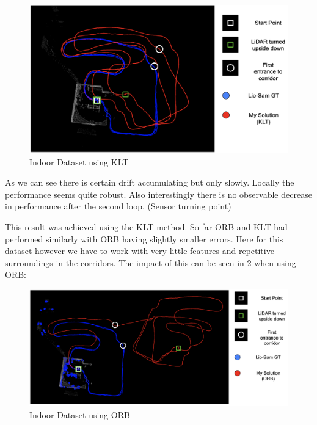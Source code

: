 {{{        \begin{figure}[ht]
            \centering
            \includegraphics[scale=0.25]{images/appendix_additionals/indoor_klt.png}
            \caption{Indoor Dataset using KLT}
            \label{fig:indoor_klt}
        \end{figure}

        As we can see there is certain drift accumulating but only slowly. Locally the performance seems quite robust. Also interestingly there is no observable decrease in performance after the second loop. (Sensor turning point)
        
        This result was achieved using the KLT method. So far ORB and KLT had performed similarly with ORB having slightly smaller errors. Here for this dataset however we have to work with very little features and repetitive surroundings in the corridors. The impact of this can be seen in \cref{fig:indoor_orb} when using ORB:
        
        \begin{figure}[ht]
            \centering
            \includegraphics[scale=0.25]{images/appendix_additionals/indoor_orb.png}
            \caption{Indoor Dataset using ORB}
            \label{fig:indoor_orb}
        \end{figure}

}}}
